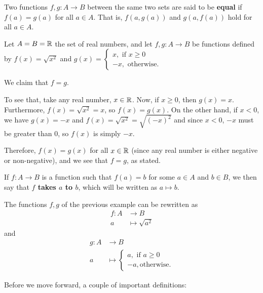 \begin{df}
	Two functions $f,g:A\to B$ between the same two sets are said to be \textbf{equal} if $f(a)=g(a)$ for all $a\in A$. That is, $f(a,g(a))$ and $g(a,f(a))$ hold for all $a\in A$.
\end{df}

\begin{ex}
	Let $A=B=\mathbb R$ the set of real numbers, and let $f,g:A\to B$ be functions defined by $f(x)=\sqrt{x^2}$ and $g(x)=\begin{cases}
	x,\mbox{ if }x\geq0\\
	-x,\mbox{ otherwise.}
	\end{cases}$
	
	We claim that $f=g$.
	
	To see that, take any real number, $x\in\mathbb R$. Now, if $x\geq 0$, then $g(x)=x$. Furthermore, $f(x)=\sqrt{x^2}=x$, so $f(x)=g(x)$. On the other hand, if $x<0$, we have $g(x)=-x$ and $f(x)=\sqrt{x^2}=\sqrt{(-x)^2}$ and since $x<0$, $-x$ must be greater than 0, so $f(x)$ is simply $-x$.
	
	Therefore, $f(x)=g(x)$ for all $x\in\mathbb R$ (since any real number is either negative or non-negative), and we see that $f=g$, as stated.
\end{ex}

\begin{df}
	If $f:A\to B$ is a function such that $f(a)=b$ for some $a\in A$ and $b\in B$, we then say that \textbf{$f$ takes $a$ to $b$}, which will be written as $a\mapsto b$.
\end{df}

\begin{ex}
	The functions $f,g$ of the previous example can be rewritten as
	\begin{align*}
	f:A&\to B\\
	a&\mapsto \sqrt{a^2}
	\end{align*}
	and
	\begin{align*}
		g:A&\to B\\
		a&\mapsto\begin{cases}
		a, \mbox{ if }a\geq0\\
		-a,\mbox{otherwise.}
		\end{cases}
	\end{align*}	
\end{ex}

Before we move forward, a couple of important definitions:

